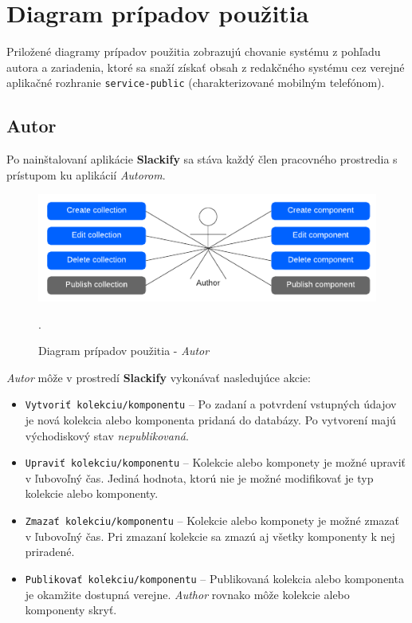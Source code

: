 \section{Diagram prípadov použitia}
Priložené diagramy prípadov použitia zobrazujú chovanie systému z pohľadu autora a zariadenia, ktoré sa snaží získať obsah z redakčného systému cez verejné aplikačné rozhranie \texttt{service-public} (charakterizované mobilným telefónom).

\subsection{Autor}
Po nainštalovaní aplikácie \textbf{Slackify} sa stáva každý člen pracovného prostredia s prístupom ku aplikácií \emph{Autorom}.

\begin{figure}[h]
	\centering
	\includegraphics[scale=1.4]{obrazky-figures/author_user_case}
	\caption{Diagram prípadov použitia - \emph{Autor}}.
\end{figure}

\noindent \emph{Autor} môže v prostredí \textbf{Slackify} vykonávať nasledujúce akcie:

\begin{itemize}
	\item \texttt{Vytvoriť kolekciu/komponentu} -- Po zadaní a potvrdení vstupných údajov je nová kolekcia alebo komponenta pridaná do databázy. Po vytvorení majú východiskový stav \emph{nepublikovaná}.
	\item \texttt{Upraviť kolekciu/komponentu} -- Kolekcie alebo komponety je možné upraviť v ľubovoľný čas. Jediná hodnota, ktorú nie je možné modifikovať je typ kolekcie alebo komponenty.
	\item \texttt{Zmazať kolekciu/komponentu} -- Kolekcie alebo komponety je možné zmazať v ľubovoľný čas. Pri zmazaní kolekcie sa zmazú aj všetky komponenty k nej priradené.
	\item \texttt{Publikovať kolekciu/komponentu} -- Publikovaná kolekcia alebo komponenta je okamžite dostupná verejne. \emph{Author} rovnako môže kolekcie alebo komponenty skryť.
\end{itemize}

